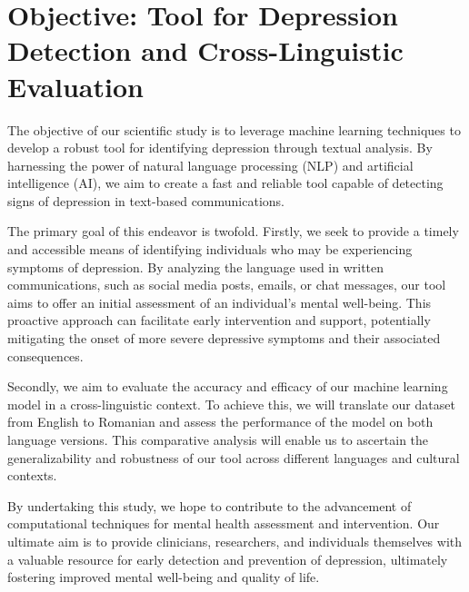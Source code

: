 \section{Objective: Tool for Depression Detection and Cross-Linguistic Evaluation}
\label{sec:ch1sec2}

The objective of our scientific study is to leverage machine learning techniques to develop a robust tool for identifying depression through textual analysis. By harnessing the power of natural language processing (NLP) and artificial intelligence (AI), we aim to create a fast and reliable tool capable of detecting signs of depression in text-based communications.

The primary goal of this endeavor is twofold. Firstly, we seek to provide a timely and accessible means of identifying individuals who may be experiencing symptoms of depression. By analyzing the language used in written communications, such as social media posts, emails, or chat messages, our tool aims to offer an initial assessment of an individual's mental well-being. This proactive approach can facilitate early intervention and support, potentially mitigating the onset of more severe depressive symptoms and their associated consequences.

Secondly, we aim to evaluate the accuracy and efficacy of our machine learning model in a cross-linguistic context. To achieve this, we will translate our dataset from English to Romanian and assess the performance of the model on both language versions. This comparative analysis will enable us to ascertain the generalizability and robustness of our tool across different languages and cultural contexts.

By undertaking this study, we hope to contribute to the advancement of computational techniques for mental health assessment and intervention. Our ultimate aim is to provide clinicians, researchers, and individuals themselves with a valuable resource for early detection and prevention of depression, ultimately fostering improved mental well-being and quality of life.